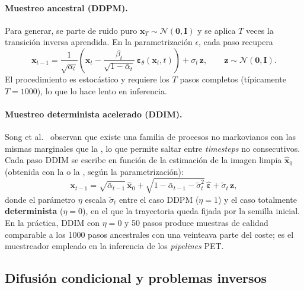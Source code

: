 \paragraph{Muestreo ancestral (DDPM).}
Para generar, se parte de ruido puro
$\mathbf{x}_T \sim \mathcal{N}(\mathbf{0}, \mathbf{I})$ y se aplica
$T$ veces la transición inversa aprendida. En la parametrización
$\epsilon$, cada paso recupera
\begin{equation}
    \mathbf{x}_{t-1}
    = \frac{1}{\sqrt{\alpha_t}}
      \!\left(\mathbf{x}_t
        - \frac{\beta_t}{\sqrt{1 - \bar{\alpha}_t}}\,
        \boldsymbol{\varepsilon}_\theta(\mathbf{x}_t, t)\right)
    + \sigma_t\,\mathbf{z},
    \qquad
    \mathbf{z} \sim \mathcal{N}(\mathbf{0}, \mathbf{I}).
    \label{eq:ddpm-step}
\end{equation}
El procedimiento es estocástico y requiere los $T$ pasos completos
(típicamente $T=1000$), lo que lo hace lento en inferencia.

\paragraph{Muestreo determinista acelerado (DDIM).}
Song et al.~\cite{song2021ddim} observan que existe una familia de
procesos no markovianos con las mismas marginales que la
, lo que permite saltar entre
\textit{timesteps} no consecutivos. Cada paso DDIM se escribe en
función de la estimación de la imagen limpia $\hat{\mathbf{x}}_0$
(obtenida con la  o la ,
según la parametrización):
\begin{equation}
    \mathbf{x}_{t-1}
    = \sqrt{\bar{\alpha}_{t-1}}\,\hat{\mathbf{x}}_0
    + \sqrt{1-\bar{\alpha}_{t-1}-\tilde{\sigma}_t^2}\,
      \hat{\boldsymbol{\varepsilon}}
    + \tilde{\sigma}_t\,\mathbf{z},
    \label{eq:ddim-step}
\end{equation}
donde el parámetro $\eta$ escala $\tilde{\sigma}_t$ entre el caso
DDPM ($\eta=1$) y el caso totalmente \textbf{determinista}
($\eta=0$), en el que la trayectoria queda fijada por la semilla
inicial. En la práctica, DDIM con $\eta=0$ y 50 pasos produce
muestras de calidad comparable a los 1000 pasos ancestrales con una
veinteava parte del coste; es el muestreador empleado en la
inferencia de los \textit{pipelines} PET.

\subsection{Difusión condicional y problemas inversos}
\label{subsec:difusion-condicional}

